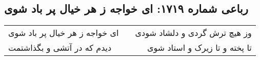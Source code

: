 \begin{center}
\section*{رباعی شماره ۱۷۱۹: ای خواجه ز هر خیال پر باد شوی}
\label{sec:1719}
\begin{longtable}{l p{0.5cm} r}
ای خواجه ز هر خیال پر باد شوی
&&
وز هیچ ترش گردی و دلشاد شودی
\\
دیدم که در آتشی و بگذاشتمت
&&
تا پخته و تا زیرک و استاد شوی
\\
\end{longtable}
\end{center}
